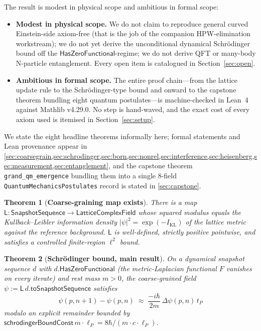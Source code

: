 \documentclass[11pt,a4paper,twoside]{article}
\newtheorem{theorem}{Theorem}[section]
\theoremstyle{definition}
\newcommand{\KL}{I_{\mathrm{KL}}}
\newcommand{\lP}{\ell_P}
\newcommand{\tP}{t_P}
\newcommand{\Lmap}{\mathsf{L}}
\newcommand{\HasZF}{\mathsf{HasZeroFunctional}}
\newcommand{\Lfield}{\mathsf{LatticeComplexField}}
\newcommand{\SnapSeq}{\mathsf{SnapshotSequence}}
\newcommand{\code}[1]{\texttt{#1}}
\begin{document}
The result is modest in physical scope and ambitious in formal scope:
\begin{itemize}
\item \textbf{Modest in physical scope.} We do not claim to reproduce
  general curved Einstein-side axiom-free (that is the job of the
  companion HPW-elimination workstream); we do not yet derive the
  unconditional dynamical Schr\"odinger bound off the
  $\HasZF$-regime; we do not derive QFT or many-body N-particle
  entanglement. Every open item is catalogued in Section~\ref{sec:open}.
\item \textbf{Ambitious in formal scope.} The entire proof chain---from
  the lattice update rule to the Schr\"odinger-type bound and onward to
  the capstone theorem bundling eight quantum postulates---is
  machine-checked in Lean~4 against Mathlib v4.29.0. No step is
  hand-waved, and the exact cost of every axiom used is itemised in
  Section~\ref{sec:setup}.
\end{itemize}

We state the eight headline theorems informally here; formal statements
and Lean provenance appear in \cref{sec:coarsegrain,sec:schrodinger,sec:born,sec:nonrel,sec:interference,sec:heisenberg,sec:measurement,sec:entanglement},
and the capstone theorem \code{grand\_qm\_emergence} bundling them into
a single 8-field \code{QuantumMechanicsPostulates} record is stated in
\cref{sec:capstone}.

\begin{theorem}[\textbf{Coarse-graining map exists}]\label{thm:T1-informal}
There is a map $\Lmap:\SnapSeq\to\Lfield$ whose squared modulus
equals the Kullback--Leibler information density
$|\psi|^{2}=\exp(-\KL)$ of the lattice metric against the reference
background. $\Lmap$ is well-defined, strictly positive pointwise, and
satisfies a controlled finite-region $\ell^{2}$ bound.
\end{theorem}

\begin{theorem}[\textbf{Schr\"odinger bound, main result}]\label{thm:T2-informal}
On a dynamical snapshot sequence $d$ with $d.\HasZF$ (the
metric-Laplacian functional $F$ vanishes on every iterate) and rest
mass $m>0$, the coarse-grained field
$\psi:=\Lmap\,d.\mathsf{toSnapshotSequence}$ satisfies
\[
\psi(p,n+1)-\psi(p,n)\;\approx\;\frac{-i\hbar}{2m}\,\Delta\psi(p,n)\,\tP
\]
modulo an explicit remainder bounded by
$\mathsf{schrodingerBoundConst}\,m\cdot\lP=8\hbar/(m\cdot c\cdot\lP)$.
\end{theorem}
\end{document}
